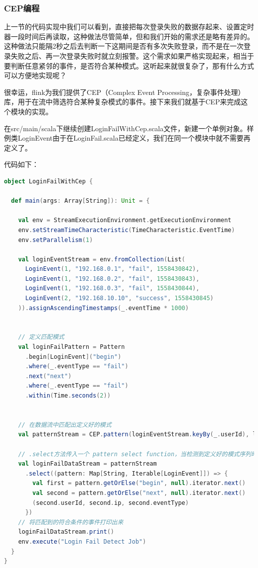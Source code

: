 \documentclass[oneside]{ctexbook}
\begin{document}
\subsubsection{CEP编程}

上一节的代码实现中我们可以看到，直接把每次登录失败的数据存起来、设置定时器一段时间后再读取，这种做法尽管简单，但和我们开始的需求还是略有差异的。这种做法只能隔2秒之后去判断一下这期间是否有多次失败登录，而不是在一次登录失败之后、再一次登录失败时就立刻报警。这个需求如果严格实现起来，相当于要判断任意紧邻的事件，是否符合某种模式。这听起来就很复杂了，那有什么方式可以方便地实现呢？

很幸运，flink为我们提供了CEP（Complex Event Processing，复杂事件处理）库，用于在流中筛选符合某种复杂模式的事件。接下来我们就基于CEP来完成这个模块的实现。

在src/main/scala下继续创建LoginFailWithCep.scala文件，新建一个单例对象。样例类LoginEvent由于在LoginFail.scala已经定义，我们在同一个模块中就不需要再定义了。

代码如下：

\begin{lstlisting}[language=scala, caption=LoginFailDetect/src/main/scala/LoginFailWithCep.scala]
object LoginFailWithCep {

  def main(args: Array[String]): Unit = {

    val env = StreamExecutionEnvironment.getExecutionEnvironment
    env.setStreamTimeCharacteristic(TimeCharacteristic.EventTime)
    env.setParallelism(1)

    val loginEventStream = env.fromCollection(List(
      LoginEvent(1, "192.168.0.1", "fail", 1558430842),
      LoginEvent(1, "192.168.0.2", "fail", 1558430843),
      LoginEvent(1, "192.168.0.3", "fail", 1558430844),
      LoginEvent(2, "192.168.10.10", "success", 1558430845)
    )).assignAscendingTimestamps(_.eventTime * 1000)


    // 定义匹配模式
    val loginFailPattern = Pattern
      .begin[LoginEvent]("begin")
      .where(_.eventType == "fail")
      .next("next")
      .where(_.eventType == "fail")
      .within(Time.seconds(2))


    // 在数据流中匹配出定义好的模式
    val patternStream = CEP.pattern(loginEventStream.keyBy(_.userId), loginFailPattern)

    // .select方法传入一个 pattern select function，当检测到定义好的模式序列时就会调用
    val loginFailDataStream = patternStream
      .select((pattern: Map[String, Iterable[LoginEvent]]) => {
        val first = pattern.getOrElse("begin", null).iterator.next()
        val second = pattern.getOrElse("next", null).iterator.next()
        (second.userId, second.ip, second.eventType)
      })
    // 将匹配到的符合条件的事件打印出来
    loginFailDataStream.print()
    env.execute("Login Fail Detect Job")
  }
}
\end{lstlisting}
\end{document}
